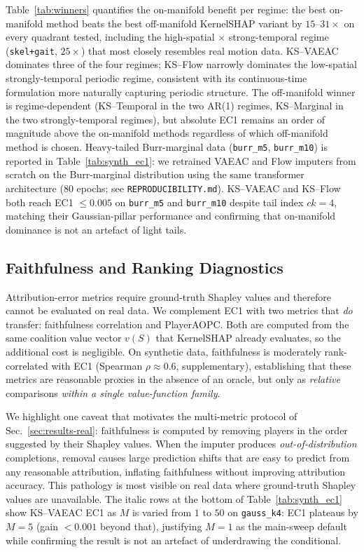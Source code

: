 

Table~\ref{tab:winners} quantifies the on-manifold benefit per regime:
the best on-manifold method beats the best off-manifold KernelSHAP
variant by $15$--$31\times$ on every quadrant tested, including the
high-spatial $\times$ strong-temporal regime (\texttt{skel+gait},
$25\times$) that most closely resembles real motion data.  KS--VAEAC
dominates three of the four regimes; KS--Flow narrowly dominates the
low-spatial strongly-temporal periodic regime, consistent with its
continuous-time formulation more naturally capturing periodic structure.
The off-manifold winner is regime-dependent (KS--Temporal in the two
AR(1) regimes, KS--Marginal in the two strongly-temporal regimes), but
absolute EC1 remains an order of magnitude above the on-manifold methods
regardless of which off-manifold method is chosen.
Heavy-tailed Burr-marginal data (\texttt{burr\_m5}, \texttt{burr\_m10})
is reported in Table~\ref{tab:synth_ec1}: we retrained VAEAC and Flow
imputers from scratch on the Burr-marginal distribution using the same
transformer architecture ($80$ epochs; see \texttt{REPRODUCIBILITY.md}).
KS--VAEAC and KS--Flow both reach EC1 $\le 0.005$ on \texttt{burr\_m5}
and \texttt{burr\_m10} despite tail index $ck{=}4$, matching their
Gaussian-pillar performance and confirming that on-manifold dominance is
not an artefact of light tails.

\subsection{Faithfulness and Ranking Diagnostics}
\label{sec:results-faithfulness}

Attribution-error metrics require ground-truth Shapley values and therefore
cannot be evaluated on real data.  We complement EC1 with two metrics that
\emph{do} transfer: faithfulness correlation and PlayerAOPC.  Both are
computed from the same coalition value vector $v(S)$ that KernelSHAP
already evaluates, so the additional cost is negligible.  On synthetic
data, faithfulness is moderately rank-correlated with EC1
(Spearman $\rho \approx 0.6$, supplementary), establishing that these
metrics are reasonable proxies in the absence of an oracle, but only as
\emph{relative} comparisons \emph{within a single value-function family}.

We highlight one caveat that motivates the multi-metric protocol of
Sec.~\ref{sec:results-real}: faithfulness is computed by removing players
in the order suggested by their Shapley values.  When the imputer produces
\emph{out-of-distribution} completions, removal causes large prediction
shifts that are easy to predict from any reasonable attribution, inflating
faithfulness without improving attribution accuracy.  This pathology is
most visible on real data where ground-truth Shapley values are unavailable.
The italic rows at the bottom of Table~\ref{tab:synth_ec1} show KS--VAEAC
EC1 as $M$ is varied from $1$ to $50$ on \texttt{gauss\_k4}: EC1 plateaus
by $M{=}5$ (gain $<0.001$ beyond that), justifying $M{=}1$ as the
main-sweep default while confirming the result is not an artefact of
underdrawing the conditional.

